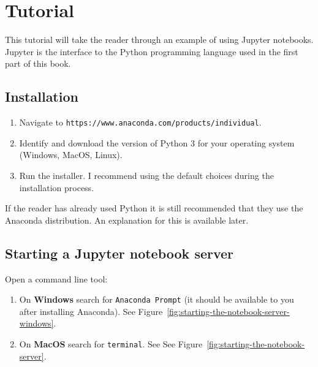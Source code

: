 \section{Tutorial}

This tutorial will take the reader through an example of using Jupyter
notebooks. Jupyter is the interface to the Python programming language used in the
first part of this book.

\subsection{Installation}
\begin{enumerate}
\item Navigate to \texttt{https://www.anaconda.com/products/individual}.

\item Identify and download the version of Python 3 for your operating system
(Windows, MacOS, Linux).

\item Run the installer. I recommend using the default choices during the
installation process.

\end{enumerate}

If the reader has already used Python it is still recommended that they use the
Anaconda distribution. An explanation for this is available later.


\subsection{Starting a Jupyter notebook server}
Open a command line tool:
\begin{enumerate}
\item 
On \textbf{Windows} search for \texttt{Anaconda Prompt} (it should be available to you
after installing Anaconda). See Figure~\ref{fig:starting-the-notebook-server-windows}.

\item On \textbf{MacOS} search for \texttt{terminal}. See
See Figure~\ref{fig:starting-the-notebook-server}.


\end{enumerate}

